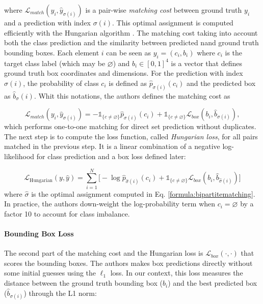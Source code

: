 where $\mathcal{L}_{match}(y_i, \hat y_{\sigma(i)})$ is a pair-wise \textit{matching cost} between ground truth $y_i$ and a prediction with index $\sigma(i)$. This optimal assignment is computed efficiently
with the Hungarian algorithm \cite{hungarian}. The matching cost taking into account both the class prediction and the similarity between predicted nand ground truth bounding boxes. Each element $i$ can be seen as $y_i = (c_i
, b_i)$ where $c_i$
is the target class label (which may be $\varnothing$) and $b_i \in [0, 1]^{4}$
is a vector that defines ground truth box coordinates and dimensions. For the
prediction with index $\sigma(i)$, the probability of class $c_i$ is defined as $ \hat p_{\sigma(i)}(c_i)$ and
the predicted box as $\hat b_\sigma(i)$. Whit this notations, the authors defines the matching cost as

\begin{equation}
	\mathcal{L}_{match}(y_i, \hat y_{\sigma(i)}) = -\mathds{1}_{\{c \neq \varnothing\}}\hat p_{\sigma(i)}(c_i) + \mathds{1}_{\{c \neq \varnothing\}}\mathcal{L}_{box}(b_i, \hat b_{\sigma(i)}),
\end{equation}
which performs one-to-one matching for direct set prediction without duplicates. The next step is to compute the loss function, called \textit{Hungarian loss}, for all pairs matched in the previous step. It is a linear combination of a negative log-likelihood for class prediction and a box loss defined later:

\begin{equation}
\mathcal{L}_{\text{Hungarian}}(y, \hat y) = \sum_{i = 1}^{N} \bigg [-\log \hat p_{\hat\sigma(i)}(c_i) + \mathds{1}_{\{c \neq \varnothing\}}\mathcal{L}_{box}(b_i, \hat b_{\hat\sigma(i)}) \bigg ]
\end{equation}
where $\hat \sigma$ is the optimal assignment computed in Eq. \ref{formula:bipartitematching}. In practice, the authors
down-weight the log-probability term when $c_i = \varnothing$ by a factor 10 to account for class imbalance. 

\paragraph{Bounding Box Loss} The second part of the matching cost and the Hungarian loss is $\mathcal{L}_{box}(\cdot, \cdot)$ that scores the bounding boxes. The authors makes box predictions directly without some initial guesses using the $\ell_1$ loss. In our context, this loss measures the distance between the ground truth bounding box ($b_i$) and the best predicted box ($\hat b_{\sigma(i)}$) through the L1 norm:

